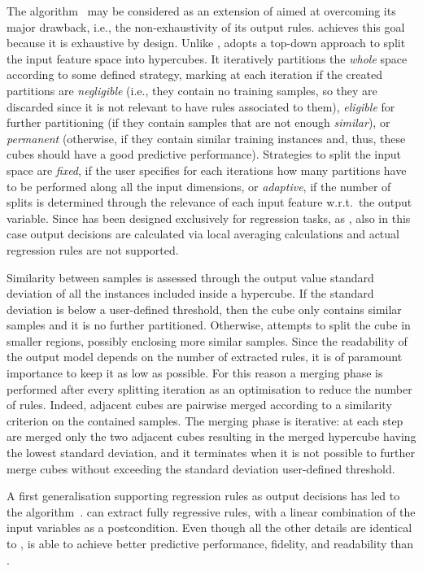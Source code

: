 \documentclass[
]{ceurart}
\begin{document}
The \gridex{} algorithm~\cite{gridex-extraamas2021} may be considered as an extension of \iter{} aimed at overcoming its major drawback, i.e., the non-exhaustivity of its output rules.
%
\gridex{} achieves this goal because it is exhaustive by design.
%
Unlike \iter{}, \gridex{} adopts a top-down approach to split the input feature space into hypercubes.
%
It iteratively partitions the \emph{whole} space according to some defined strategy, marking at each iteration if the created partitions are \emph{negligible} (i.e., they contain no training samples, so they are discarded since it is not relevant to have rules associated to them), \emph{eligible} for further partitioning (if they contain samples that are not enough \emph{similar}), or \emph{permanent} (otherwise, if they contain similar training instances and, thus, these cubes should have a good predictive performance).
%
Strategies to split the input space are \emph{fixed}, if the user specifies for each iterations how many partitions have to be performed along all the input dimensions, or \emph{adaptive}, if the number of splits is determined through the relevance of each input feature w.r.t.\ the output variable.
%
Since \gridex{} has been designed exclusively for regression tasks, as \iter{}, also in this case output decisions are calculated via local averaging calculations and actual regression rules are not supported.

Similarity between samples is assessed through the output value standard deviation of all the instances included inside a hypercube.
%
If the standard deviation is below a user-defined threshold, then the cube only contains similar samples and it is no further partitioned.
%
Otherwise, \gridex{} attempts to split the cube in smaller regions, possibly enclosing more similar samples.
%
Since the readability of the output model depends on the number of extracted rules, it is of paramount importance to keep it as low as possible.
%
For this reason a merging phase is performed after every splitting iteration as an optimisation to reduce the number of rules.
%
Indeed, adjacent cubes are pairwise merged according to a similarity criterion on the contained samples.
%
The merging phase is iterative: at each step are merged only the two adjacent cubes resulting in the merged hypercube having the lowest standard deviation, and it terminates when it is not possible to further merge cubes without exceeding the standard deviation user-defined threshold.

A first \gridex{} generalisation supporting regression rules as output decisions has led to the \gridrex{} algorithm~\cite{gridrex-kr2022}.
%
\gridrex{} can extract fully regressive rules, with a linear combination of the input variables as a postcondition.
%
Even though all the other details are identical to \gridex{}, \gridrex{} is able to achieve better predictive performance, fidelity, and readability than \gridex{}.
\end{document}
